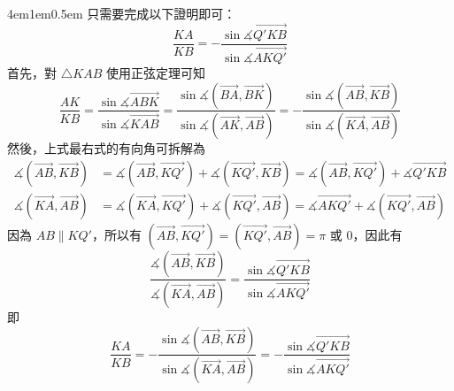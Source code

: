 \documentclass[12pt]{article}
\begin{document}
\begin{mybox}{4em}{1em}{0.5em}
    只需要完成以下證明即可：
    $$
        \frac{KA}{KB} = -\frac{\sin{\measuredangle{\overrightarrow{Q'KB}}}}{\sin{\measuredangle{\overrightarrow{AKQ'}}}}
    $$
    首先，對 $\triangle{KAB}$ 使用正弦定理可知
    $$
        \frac{AK}{KB} = \frac{\sin{\measuredangle{\overrightarrow{ABK}}}}{\sin{\measuredangle{\overrightarrow{KAB}}}} = 
        \frac{\sin{\measuredangle{\left(\overrightarrow{BA},\overrightarrow{BK}\right)}}}{\sin{\measuredangle{\left(\overrightarrow{AK},\overrightarrow{AB}\right)}}} 
        = -\frac{\sin{\measuredangle{\left(\overrightarrow{AB},\overrightarrow{KB}\right)}}}{\sin{\measuredangle{\left(\overrightarrow{KA},\overrightarrow{AB}\right)}}}
    $$
    然後，上式最右式的有向角可拆解為
    \begin{align*}
        \measuredangle{\left(\overrightarrow{AB},\overrightarrow{KB}\right)} &= \measuredangle{\left(\overrightarrow{AB},\overrightarrow{KQ'}\right)} + \measuredangle{\left(\overrightarrow{KQ'},\overrightarrow{KB}\right)} = \measuredangle{\left(\overrightarrow{AB},\overrightarrow{KQ'}\right)} + \measuredangle{\overrightarrow{Q'KB}}\\
        \measuredangle{\left(\overrightarrow{KA},\overrightarrow{AB}\right)} &= \measuredangle{\left(\overrightarrow{KA},\overrightarrow{KQ'}\right)} + \measuredangle{\left(\overrightarrow{KQ'},\overrightarrow{AB}\right)} = \measuredangle{\overrightarrow{AKQ'}} + \measuredangle{\left(\overrightarrow{KQ'},\overrightarrow{AB}\right)}
    \end{align*}
    因為 $AB \parallel KQ'$，所以有 $\left(\overrightarrow{AB}, \overrightarrow{KQ'}\right) = \left(\overrightarrow{KQ'}, \overrightarrow{AB}\right) = \pi$ 或 $0$，因此有
    $$
    \frac{\measuredangle{\left(\overrightarrow{AB},\overrightarrow{KB}\right)}}{\measuredangle{\left(\overrightarrow{KA},\overrightarrow{AB}\right)}} = \frac{\sin{\measuredangle{\overrightarrow{Q'KB}}}}{\sin{\measuredangle{\overrightarrow{AKQ'}}}}
    $$
    即
    $$
        \frac{KA}{KB} = -\frac{\sin{\measuredangle{\left(\overrightarrow{AB},\overrightarrow{KB}\right)}}}{\sin{\measuredangle{\left(\overrightarrow{KA},\overrightarrow{AB}\right)}}} = -\frac{\sin{\measuredangle{\overrightarrow{Q'KB}}}}{\sin{\measuredangle{\overrightarrow{AKQ'}}}}
    $$
\end{mybox}
\end{document}
